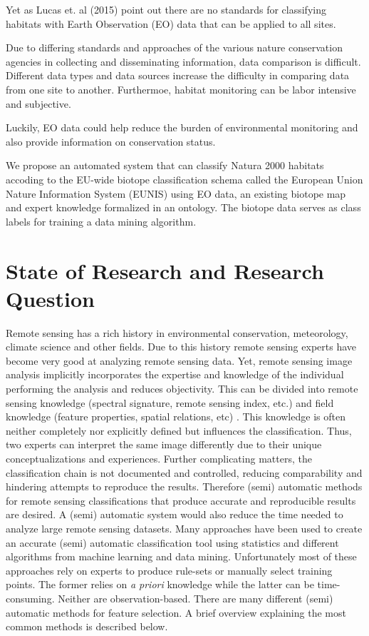 \documentclass[authoryear, review,12pt,number]{elsarticle}
\begin{document}
Yet as Lucas et. al (2015) point out there are no standards for classifying
habitats with Earth Observation (EO) data that can be applied to all sites. 

Due to differing standards and approaches of the various nature conservation
agencies in collecting and disseminating information, data comparison is
difficult. Different data types and data sources increase the difficulty in
comparing data from one site to another. Furthermoe, habitat monitoring can
be labor intensive and subjective.

Luckily, EO data could help reduce the burden of environmental monitoring and
also provide information on conservation status.

We propose an automated system that can classify Natura 2000 habitats
accoding to the EU-wide biotope classification schema called the European Union
Nature Information System (EUNIS) using EO data, an existing biotope map and
expert knowledge formalized in an ontology. The biotope data serves as class
labels for training a data mining algorithm.

\section{State of Research and Research Question}
Remote sensing has a rich history in environmental conservation, meteorology,
climate science and other fields. Due to this history remote sensing experts
have become very good at analyzing remote sensing data. Yet, remote sensing
image analysis implicitly incorporates the expertise and knowledge of the
individual performing the analysis and reduces objectivity. This can be divided
into remote sensing knowledge (spectral signature, remote sensing index, etc.)
and field knowledge (feature properties, spatial relations, etc)
\citep{Andres2013a}. This knowledge is often neither completely nor explicitly
defined but influences the classification. Thus, two experts can interpret the
same image differently due to their unique conceptualizations and experiences.
Further complicating matters, the classification chain is not documented and
controlled, reducing comparability and hindering attempts to reproduce the
results\citep{Arvor2013}. Therefore (semi) automatic methods for remote sensing
classifications that produce accurate and reproducible results are desired.
A (semi) automatic system would also reduce the time needed to analyze large
remote sensing datasets. Many approaches have been used to create an accurate
(semi) automatic classification tool using statistics and different algorithms
from machine learning and data mining. Unfortunately most of these approaches
rely on experts to produce rule-sets or manually select training points. The
former relies on \emph{a priori} knowledge while the latter can be
time-consuming.
Neither are observation-based. There are many different (semi) automatic methods
for feature selection. A brief overview explaining the most common methods is
described below.
\end{document}
